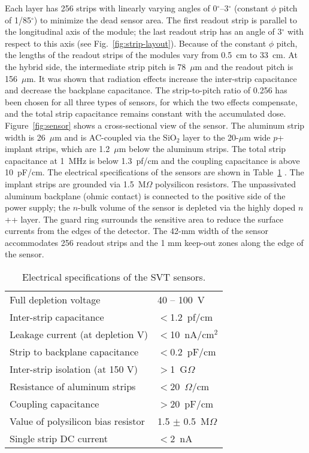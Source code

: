 Each layer has 256 strips with linearly varying angles of 0$^\circ$--3$^\circ$ (constant $\phi$ pitch of 1/85$^\circ$)
to minimize the dead sensor area. The first readout strip is parallel to the longitudinal axis of the module; the last
readout strip has an angle of 3$^\circ$ with respect to this axis (see Fig.~\ref{fig:strip-layout}). Because of the
constant $\phi$ pitch, the lengths of the readout strips of the modules vary from 0.5~cm to 33~cm. At the hybrid
side, the intermediate strip pitch is 78~$\mu$m and the readout pitch is 156~$\mu$m. It was shown
\cite{BRAIBANTNOTE} that radiation effects increase the inter-strip capacitance and decrease the backplane
capacitance. The strip-to-pitch ratio of 0.256 has been chosen for all three types of sensors, for which the two
effects compensate, and the total strip capacitance remains constant with the accumulated dose.
Figure~\ref{fig:sensor} shows a cross-sectional view of the sensor. The aluminum strip width is 26~$\mu$m and
is AC-coupled via the SiO$_2$ layer to the 20-$\mu$m wide $p$+ implant strips, which are 1.2~$\mu$m below the
aluminum strips. The total strip capacitance at 1~MHz is below 1.3~pf/cm and the coupling capacitance is above
10~pF/cm. The electrical specifications of the sensors are shown in Table~\ref{tab:sensor-table}
\cite{SENSORNOTE}. The implant strips are grounded via 1.5~M$\Omega$ polysilicon resistors. The unpassivated
aluminum backplane (ohmic contact) is connected to the positive side of the power supply; the $n$-bulk volume of the
sensor is depleted via the highly doped $n$++ layer. The guard ring surrounds the sensitive area to reduce the
surface currents from the edges of the detector. The 42-mm width of the sensor accommodates 256 readout strips
and the 1 mm keep-out zones along the edge of the sensor.

\begin{table}[h]
\begin{tabular}{ll}
\hline
Full depletion voltage      & 40 -- 100~V \\ 
Inter-strip capacitance      & $<$1.2~pf/cm                       \\
Leakage current (at depletion V)        & $<$10~nA/cm$^2$                       \\
Strip to backplane capacitance        & $<$0.2~pF/cm                       \\
Inter-strip isolation (at 150 V)           & $>$1~G$\Omega$                       \\ 
Resistance of aluminum strips        & $<$20~$\Omega$/cm                       \\
Coupling capacitance        & $>$20~pF/cm                       \\
Value of polysilicon bias resistor   & 1.5 $\pm$ 0.5~M$\Omega$     \\
Single strip DC current & $<$2~nA\\ \hline
\end{tabular}
\caption{Electrical specifications of the SVT sensors.}
\label{tab:sensor-table}
\end{table}

